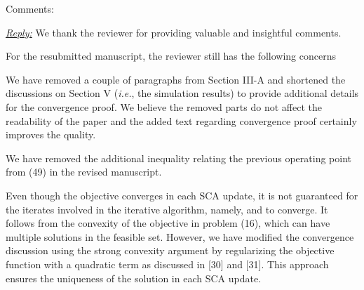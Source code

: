 Comments:

\vspace{1eM}
\underline{\textit{Reply:}} We thank the reviewer for providing valuable and insightful comments.

\vspace{1eM}
For the resubmitted manuscript, the reviewer still has the following concerns

\begin{enumerate}
 

\resp We have removed a couple of paragraphs from Section III-A and shortened the discussions on Section V (\textit{i.e.}, the simulation results) to provide additional details for the convergence proof. We believe the removed parts do not affect the readability of the paper and the added text regarding convergence proof certainly improves the quality. 

 

\resp We have removed the additional inequality relating the previous operating point from (49) in the revised manuscript. 

 

\resp  Even though the objective converges in each \ac{SCA} update, it is not guaranteed for the iterates involved in the iterative algorithm, namely,  and  to converge. It follows from the convexity of the objective in problem (16), which can have multiple solutions in the feasible set. However, we have modified the convergence discussion using the strong convexity argument by regularizing the objective function with a quadratic term as discussed in [30] and [31]. This approach ensures the uniqueness of the solution in each \ac{SCA} update. 


\end{enumerate}
